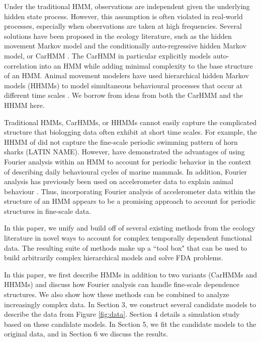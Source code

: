 Under the traditional HMM, observations are independent given the underlying hidden state process. However, this assumption is often violated in real-world processes, especially when observations are taken at high frequencies. Several solutions have been proposed in the ecology literature, such as the hidden movement Markov model \citep{Whoriskey:2016} and the conditionally auto-regressive hidden Markov model, or CarHMM \citep{Lawler:2019}. The CarHMM in particular explicitly models auto-correlation into an HMM while adding minimal complexity to the base structure of an HMM. Animal movement modelers have used hierarchical hidden Markov models (HHMMs) to model simultaneous behavioural processes that occur at different time scales \citep{Barajas:2017,Adam:2019}. We borrow from ideas from both the CarHMM and the HHMM here.

Traditional HMMs, CarHMMs, or HHMMs cannot easily capture the complicated structure that biologging data often exhibit at short time scales. For example, the HHMM of \citet{Adam:2019} did not capture the fine-scale periodic swimming pattern of  horn sharks (LATIN NAME). However, \citet{Heerah:2017} have demonstrated the advantages of using Fourier analysis within an HMM to account for periodic behavior in the context of describing daily behavioural cycles of marine mammals. In addition, Fourier analysis has previously been used on accelerometer data to explain animal behaviour \citep{Fehlmann:2017,Shorter:2017}. Thus, incorporating Fourier analysis of accelerometer data within the structure of an HMM appears to be a promising approach to account for periodic structures in fine-scale data.

In this paper, we unify and build off of several existing methods from the ecology literature in novel ways to account for complex temporally dependent functional data. The resulting suite of methods make up a ``tool box" that can be used to build arbitrarily complex hierarchical models and solve FDA problems.

In this paper, we first describe HMMs in addition to two variants (CarHMMs and HHMMs) and discuss  how Fourier analysis can handle fine-scale dependence structures. We also show how these methods can be combined to analyze increasingly complex data. In Section 3, we construct several candidate models to describe the data from Figure \ref{fig:data}. Section 4 details a simulation study based on these candidate models. In Section 5, we fit the candidate models to the original data, and in Section 6 we discuss the results.